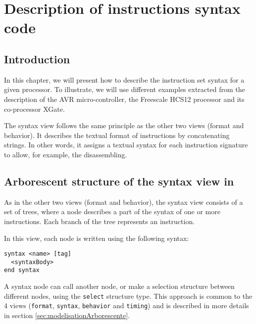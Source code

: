 \chapter{Description of instructions syntax code}
\label{chap:syntax}
\section{Introduction}
In this chapter, we will present how to describe the instruction set syntax for a given processor. To illustrate, we will use different examples extracted from the description of the AVR micro-controller, the Freescale HCS12 processor and its co-processor XGate. 

The syntax view follows the same principle as the other two views (format and behavior). It describes the textual format of instructions by concatenating strings. In other words, it assigns a textual syntax for each instruction signature to allow, for example, the disassembling.

\section {Arborescent structure of the syntax view in \harmless}
As in the other two views (format and behavior), the syntax view consists of a set of trees, where a node describes a part of the syntax of one or more instructions. Each branch of the tree represents an instruction.

In this view, each node is written using the following syntax:

\begin{lstlisting}
syntax <name> [tag]
  <syntaxBody>
end syntax
\end{lstlisting}

A syntax node can call another node, or make a selection structure between different nodes, using the \texttt{select} structure type. This approach is common to the 4 views (\texttt{format}, \texttt{syntax}, \texttt{behavior} and \texttt{timing}) and is described in more details in section \ref{sec:modelisationArborescente}.

